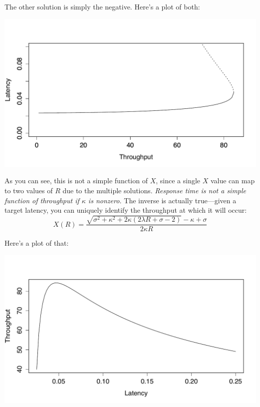 \documentclass{vivid_layout}
\begin{document}
The other solution is simply the negative. Here's a plot of both:
\begin{center}
\includegraphics[width=.85\linewidth]{scalability/nose-equation}
\end{center}

As you can see, this is not a simple function of $X$, since a single $X$ value
can map to two values of $R$ due to the multiple solutions. {\itshape Response
time is not a simple function of throughput if $\kappa$ is nonzero.} The inverse is
actually true---given a target latency, you can uniquely identify the throughput
at which it will occur:
\begin{equation}
X(R)=\frac{\sqrt{\sigma^2+\kappa^2+2\kappa(2\lambda R+\sigma-2)}-\kappa+\sigma}{2\kappa R}
\label{x_r}
\end{equation}

Here's a plot of that:
\begin{center}
\includegraphics[width=.85\linewidth]{scalability/x-function-r}
\end{center}
\end{document}

